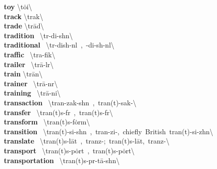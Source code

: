 \documentclass[10pt,a4paper]{article}
\begin{document}
\begin{multicols}{2}
\textbf{ toy }\quad \textbackslash \textprimstress t\.{o}i\textbackslash \\
\textbf{ track }\quad \textbackslash \textprimstress trak\textbackslash \\
\textbf{ trade }\quad \textbackslash \textprimstress tr\={a}d\textbackslash \\
\textbf{ tradition }\quad \ \textbackslash tr\textschwa -\textprimstress di-sh\textschwa n\textbackslash \\
\textbf{ traditional }\quad \ \textbackslash tr\textschwa -\textprimstress dish-n\textschwa l\ ,\ -\textprimstress di-sh\textschwa -n\textsuperscript{\textreve}l\textbackslash \\
\textbf{ traffic }\quad \ \textbackslash \textprimstress tra-fik\textbackslash \\
\textbf{ trailer }\quad \ \textbackslash \textprimstress tr\={a}-l\textschwa r\textbackslash \\
\textbf{ train }\quad \textbackslash \textprimstress tr\={a}n\textbackslash \\
\textbf{ trainer }\quad \ \textbackslash \textprimstress tr\={a}-n\textschwa r\textbackslash \\
\textbf{ training }\quad \ \textbackslash \textprimstress tr\={a}-ni\engma \textbackslash \\
\textbf{ transaction }\quad \ \textbackslash tran-\textprimstress zak-sh\textschwa n\ ,\ tran(t)-\textprimstress sak-\textbackslash \\
\textbf{ transfer }\quad \ \textbackslash tran(t)s-\textprimstress f\textschwa r\ ,\ \textprimstress tran(t)s-\textsecstress f\textschwa r\textbackslash \\
\textbf{ transform }\quad \ \textbackslash tran(t)s-\textprimstress f\.{o}rm\textbackslash \\
\textbf{ transition }\quad \ \textbackslash tran(t)-\textprimstress si-sh\textschwa n\ ,\ tran-\textprimstress zi-,\ chiefly\ British\ tran(t)-\textprimstress si-zh\textschwa n\textbackslash \\
\textbf{ translate }\quad \ \textbackslash tran(t)s-\textprimstress l\={a}t\ ,\ tranz-;\ \textprimstress tran(t)s-\textsecstress l\={a}t,\ \textprimstress tranz-\textbackslash \\
\textbf{ transport }\quad \ \textbackslash tran(t)s-\textprimstress p\.{o}rt\ ,\ \textprimstress tran(t)s-\textsecstress p\.{o}rt\textbackslash \\
\textbf{ transportation }\quad \ \textbackslash \textsecstress tran(t)s-p\textschwa r-\textprimstress t\={a}-sh\textschwa n\textbackslash \\

\end{multicols}
\end{document}
